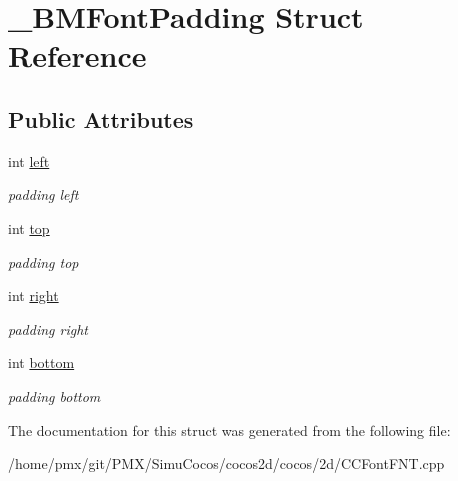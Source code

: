 \hypertarget{struct__BMFontPadding}{}\section{\+\_\+\+B\+M\+Font\+Padding Struct Reference}
\label{struct__BMFontPadding}
\subsection*{Public Attributes}
\begin{DoxyCompactItemize}
\item 
int \hyperlink{group__label_ga8129887cd2f3f177100cd4fedf20e347}{left}
\begin{DoxyCompactList}\small\item\em padding left \end{DoxyCompactList}\item 
int \hyperlink{group__label_gad673e6ff522f10836afba0745f3c4ee8}{top}
\begin{DoxyCompactList}\small\item\em padding top \end{DoxyCompactList}\item 
int \hyperlink{group__label_gac83f97e64d8fa8a835a17c44d93f9f62}{right}
\begin{DoxyCompactList}\small\item\em padding right \end{DoxyCompactList}\item 
int \hyperlink{group__label_ga41ee44807cde2134c0ff73208dccf6e7}{bottom}
\begin{DoxyCompactList}\small\item\em padding bottom \end{DoxyCompactList}\end{DoxyCompactItemize}


The documentation for this struct was generated from the following file\+:\begin{DoxyCompactItemize}
\item 
/home/pmx/git/\+P\+M\+X/\+Simu\+Cocos/cocos2d/cocos/2d/C\+C\+Font\+F\+N\+T.\+cpp\end{DoxyCompactItemize}
